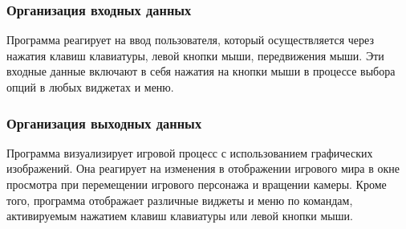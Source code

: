 \subsubsection{Организация входных данных}

Программа реагирует на ввод пользователя, который осуществляется через нажатия клавиш клавиатуры, левой кнопки мыши, передвижения мыши.
Эти входные данные включают в себя нажатия на кнопки мыши в процессе выбора опций в любых виджетах и меню.

\subsubsection{Организация выходных данных}

Программа визуализирует игровой процесс с использованием графических изображений. Она реагирует на изменения в отображении игрового мира в окне просмотра при перемещении игрового персонажа и вращении камеры. Кроме того, программа отображает различные виджеты и меню по командам, активируемым нажатием клавиш клавиатуры или левой кнопки мыши.
